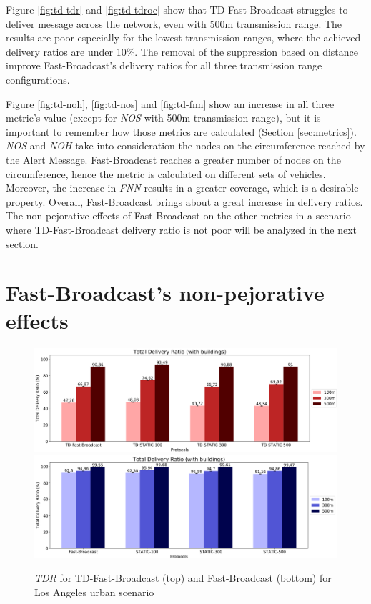 	Figure \ref{fig:td-tdr} and \ref{fig:td-tdroc} show that TD-Fast-Broadcast struggles to deliver message across the network, even with 500m transmission range. The results are poor especially for the lowest transmission ranges, where the achieved delivery ratios are under 10\%. The removal of the suppression based on distance improve Fast-Broadcast's delivery ratios for all three transmission range configurations. 
	
	
	Figure \ref{fig:td-noh}, \ref{fig:td-nos} and \ref{fig:td-fnn} show an increase in all three metric's value (except for \textit{NOS} with 500m transmission range), but it is important to remember how those metrics are calculated (Section \ref{sec:metrics}). \textit{NOS} and \textit{NOH} take into consideration the nodes on the circumference reached by the Alert Message. Fast-Broadcast reaches a greater number of nodes on the circumference, hence the metric is calculated on different sets of vehicles. Moreover, the increase in \textit{FNN} results in a greater coverage, which is a desirable property. Overall, Fast-Broadcast brings about a great increase in delivery ratios. The non pejorative effects of Fast-Broadcast on the other metrics in a scenario where TD-Fast-Broadcast delivery ratio is not poor will be analyzed in the next section.
	
	\section{Fast-Broadcast's non-pejorative effects}
		\begin{figure}[H]
			\centering	
			\includegraphics[width=1.0\textwidth]{immagini/td-fb-la/td-fb/tdr}
			\includegraphics[width=1.0\textwidth]{immagini/td-fb-la/fb/tdr}
			\caption{\textit{TDR} for TD-Fast-Broadcast (top) and Fast-Broadcast (bottom) for Los Angeles urban scenario}
			\label{fig:la-td-tdr}
		\end{figure}
			
